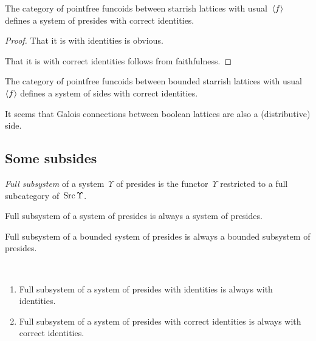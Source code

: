 \begin{prop}
The category of pointfree funcoids between starrish lattices with usual~$\left\langle f\right\rangle$ defines a system of presides with correct identities.
\end{prop}

\begin{proof}
That it is with identities is obvious.

That it is with correct identities follows from faithfulness.
\end{proof}

\begin{obvious}
The category of pointfree funcoids between bounded starrish lattices with usual~$\left\langle f\right\rangle$ defines a system of sides with correct identities.
\end{obvious}

It seems  that Galois connections between boolean lattices 
are also a (distributive) side.



\subsection{Some subsides}

\begin{defn}
\emph{Full subsystem} of a system~$\Upsilon$ of presides is the functor~$\Upsilon$ restricted to a full subcategory of~$\operatorname{Src}\Upsilon$.
\end{defn}

\begin{obvious}
Full subsystem of a system of presides is always a system of presides.
\end{obvious}

\begin{obvious}
Full subsystem of a bounded system of presides is always a bounded subsystem of presides.
\end{obvious}

\begin{obvious}
~
\begin{enumerate}
\item Full subsystem of a system of presides with identities is always with identities.
\item Full subsystem of a system of presides with correct identities is always with correct identities.
\end{enumerate}
\end{obvious}


